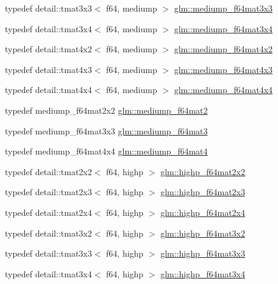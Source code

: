 \begin{DoxyCompactItemize}
\item 
typedef detail\+::tmat3x3$<$ f64, mediump $>$ \hyperlink{group__gtc__type__precision_ga871b69a221dae7461aa746e6e6d372fc}{glm\+::mediump\+\_\+f64mat3x3}
\item 
typedef detail\+::tmat3x4$<$ f64, mediump $>$ \hyperlink{group__gtc__type__precision_gac3b0ca6d79631a2480cee8897dcd79ec}{glm\+::mediump\+\_\+f64mat3x4}
\item 
typedef detail\+::tmat4x2$<$ f64, mediump $>$ \hyperlink{group__gtc__type__precision_ga4a7a2b6889f08c9209a4f994fd87cc4e}{glm\+::mediump\+\_\+f64mat4x2}
\item 
typedef detail\+::tmat4x3$<$ f64, mediump $>$ \hyperlink{group__gtc__type__precision_ga4a920abfb082b0ffd8d89614cb787021}{glm\+::mediump\+\_\+f64mat4x3}
\item 
typedef detail\+::tmat4x4$<$ f64, mediump $>$ \hyperlink{group__gtc__type__precision_ga941e42a0b337b5c8ad9c324aaa6b2ad5}{glm\+::mediump\+\_\+f64mat4x4}
\item 
typedef mediump\+\_\+f64mat2x2 \hyperlink{group__gtc__type__precision_gaa7eac0340d2aaf670ec4dfbd1826fd35}{glm\+::mediump\+\_\+f64mat2}
\item 
typedef mediump\+\_\+f64mat3x3 \hyperlink{group__gtc__type__precision_gae38a4a0b57e25d9cbb153dcaab9432ec}{glm\+::mediump\+\_\+f64mat3}
\item 
typedef mediump\+\_\+f64mat4x4 \hyperlink{group__gtc__type__precision_ga2763f655bfe2141a014e66d26a9d2f18}{glm\+::mediump\+\_\+f64mat4}
\item 
typedef detail\+::tmat2x2$<$ f64, highp $>$ \hyperlink{group__gtc__type__precision_ga4babca568fc88f185620c02e4fdac0d8}{glm\+::highp\+\_\+f64mat2x2}
\item 
typedef detail\+::tmat2x3$<$ f64, highp $>$ \hyperlink{group__gtc__type__precision_gafb5b42b29b3bd7f1605483223fa35312}{glm\+::highp\+\_\+f64mat2x3}
\item 
typedef detail\+::tmat2x4$<$ f64, highp $>$ \hyperlink{group__gtc__type__precision_ga72fae79e6633cbc6bf691f69278b36d3}{glm\+::highp\+\_\+f64mat2x4}
\item 
typedef detail\+::tmat3x2$<$ f64, highp $>$ \hyperlink{group__gtc__type__precision_ga5cdc9d6fb9ce07e5485c4e2db919ce7e}{glm\+::highp\+\_\+f64mat3x2}
\item 
typedef detail\+::tmat3x3$<$ f64, highp $>$ \hyperlink{group__gtc__type__precision_gaf520a9307867c632408029a53af3e375}{glm\+::highp\+\_\+f64mat3x3}
\item 
typedef detail\+::tmat3x4$<$ f64, highp $>$ \hyperlink{group__gtc__type__precision_ga4144f547189dd7e52b4dd282f41a1cd1}{glm\+::highp\+\_\+f64mat3x4}

\end{DoxyCompactItemize}
